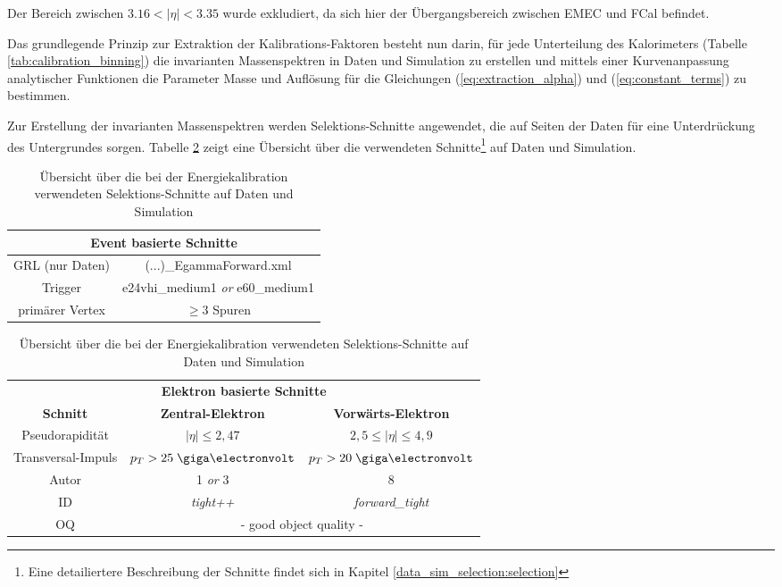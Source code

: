 Der Bereich zwischen $3.16 < |\eta| < 3.35$ wurde exkludiert, da sich
hier der Übergangsbereich zwischen \acs{EMEC} und \acs{FCal} befindet.

Das grundlegende Prinzip zur Extraktion der Kalibrations-Faktoren besteht nun
darin, für jede Unterteilung des Kalorimeters (Tabelle
\ref{tab:calibration_binning}) die invarianten Massenspektren in Daten und
Simulation zu erstellen und mittels einer Kurvenanpassung analytischer
Funktionen die Parameter Masse und Auflösung für die Gleichungen
(\ref{eq:extraction_alpha}) und (\ref{eq:constant_terms}) zu bestimmen.

Zur Erstellung der invarianten Massenspektren werden Selektions-Schnitte
angewendet, die auf Seiten der Daten für eine Unterdrückung des Untergrundes
sorgen. Tabelle \ref{tab:calibration_cuts} zeigt eine Übersicht über die
verwendeten Schnitte\footnote{Eine detailiertere Beschreibung der Schnitte
findet sich in Kapitel \ref{data_sim_selection:selection}} auf Daten
und Simulation.

\begin{table}[h]
    \centering
    \begin{tabular}{|c|c|}
        \hline
        \multicolumn{2}{|c|}{\textbf{Event basierte Schnitte}} \\
        \hline\hline
        \acs{GRL} (nur Daten) & (...)\_EgammaForward.xml \\
        \hline
        Trigger & e24vhi\_medium1 \textit{or} e60\_medium1 \\
        \hline
        primärer Vertex & $\geq 3$ Spuren \\
        \hline
    \end{tabular}
    \vspace{15pt}

    \begin{tabular}{|c|c|c|}
        \hline
        \multicolumn{3}{|c|}{\textbf{Elektron basierte Schnitte}} \\
        \textbf{Schnitt}&\textbf{Zentral-Elektron}&\textbf{Vorwärts-Elektron}\\
        \hline \hline
        Pseudorapidität & $|\eta| \leq 2,47$ & $2,5 \leq |\eta| \leq 4,9$ \\
        \hline
        Transversal-Impuls & $p_T > 25 \GeV$ & $p_T > 20 \GeV$ \\
        \hline
        Autor & 1 \textit{or} 3 & 8 \\
        \hline
        ID & \textit{tight++} & \textit{forward\_tight} \\
        \hline
        OQ & \multicolumn{2}{|c|}{- good object quality -} \\
        \hline
    \end{tabular}
    \caption{Übersicht über die bei der Energiekalibration verwendeten
        Selektions-Schnitte auf Daten und Simulation}
    \label{tab:calibration_cuts}
\end{table}

